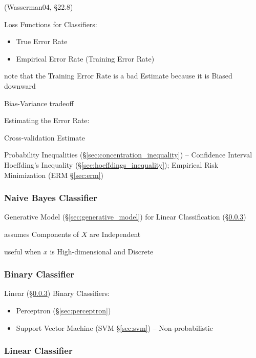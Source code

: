 (Wasserman04, \S22.8)

Loss Functions for Classifiers:
\begin{itemize}
  \item True Error Rate
  \item Empirical Error Rate (Training Error Rate)
\end{itemize}

note that the Training Error Rate is a bad Estimate because it is Biased
downward

Bias-Variance tradeoff

Estimating the Error Rate:

Cross-validation Estimate

Probability Inequalities (\S\ref{sec:concentration_inequality}) -- Confidence
Interval \fist Hoeffding's Inequality (\S\ref{sec:hoeffdings_inequality});
Empirical Risk Minimization (ERM \S\ref{sec:erm})



\subsubsection{Naive Bayes Classifier}\label{sec:naive_bayes}

Generative Model (\S\ref{sec:generative_model}) for Linear Classification
(\S\ref{sec:linear_classifier})

assumes Components of $X$ are Independent

useful when $x$ is High-dimensional and Discrete



\subsubsection{Binary Classifier}\label{sec:binary_classifier}

Linear (\S\ref{sec:linear_classifier}) Binary Classifiers:
\begin{itemize}
  \item Perceptron (\S\ref{sec:perceptron})
  \item Support Vector Machine (SVM \S\ref{sec:svm}) -- Non-probabilistic
\end{itemize}



\subsubsection{Linear Classifier}\label{sec:linear_classifier}

